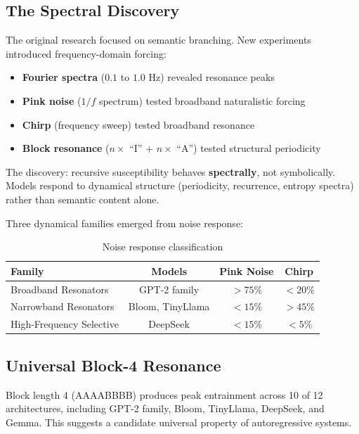 \documentclass[12pt,a4paper]{article}
\begin{document}
\subsection{The Spectral Discovery}

The original research focused on semantic branching. New experiments introduced frequency-domain forcing:

\begin{itemize}
    \item \textbf{Fourier spectra} ($0.1$ to $1.0$ Hz) revealed resonance peaks
    \item \textbf{Pink noise} ($1/f$ spectrum) tested broadband naturalistic forcing
    \item \textbf{Chirp} (frequency sweep) tested broadband resonance
    \item \textbf{Block resonance} ($n \times$ ``I'' $+$ $n \times$ ``A'') tested structural periodicity
\end{itemize}

The discovery: recursive susceptibility behaves \textbf{spectrally}, not symbolically. Models respond to dynamical structure (periodicity, recurrence, entropy spectra) rather than semantic content alone.

Three dynamical families emerged from noise response:

\begin{table}[H]
\centering
\caption{Noise response classification}
\label{tab:addendum_families}
\begin{tabular}{lccc}
\toprule
Family & Models & Pink Noise & Chirp \\
\midrule
Broadband Resonators & GPT-2 family & $>75\%$ & $<20\%$ \\
Narrowband Resonators & Bloom, TinyLlama & $<15\%$ & $>45\%$ \\
High-Frequency Selective & DeepSeek & $<15\%$ & $<5\%$ \\
\bottomrule
\end{tabular}
\end{table}

\subsection{Universal Block-4 Resonance}

Block length 4 (AAAABBBB) produces peak entrainment across 10 of 12 architectures, including GPT-2 family, Bloom, TinyLlama, DeepSeek, and Gemma. This suggests a candidate universal property of autoregressive systems.
\end{document}
